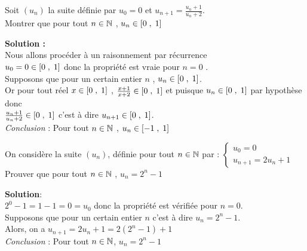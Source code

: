 \begin{exercice}
 Soit $(u_{n})$ la suite définie par $u_{0}=0$ et $ u_{n+1}= \frac{u_{n}+1}{u_{n}+2}$.\\
Montrer que pour tout $ n\in\mathbb{N} $ , $ u_{n}\in\left[0\;,\; 1\right] $ 
\end{exercice}
\textbf{Solution :}\\
 Nous allons procéder à un raisonnement par récurrence \\
$u_{0}=0 \in\left[0\;,\; 1\right] $ donc la propriété  est vraie pour $ n=0 $ .\\
Supposons que pour un certain  entier $ n$ , $ u_{n}\in\left[0\;,\; 1\right] $.\\
Or pour tout réel $ x\in\left[0\;,\; 1\right] $ , $\frac{x+1}{x+2}\in\left[0\;,\; 1\right] $ et puisque $ u_{n}\in\left[0\;,\; 1\right]$  par hypothèse donc \\
$ \frac{u_{n}+1}{u_{n}+2}\in\left[0\;,\; 1\right]$ c'est à dire $ u_{n+1}\in\left[0\;,\; 1\right]$. \\
\emph{Conclusion} : Pour tout $ n\in\mathbb{N} $ , $ u_{n}\in\left[-1\;,\; 1\right] $
\begin{exercice}
 On considère la suite $(u_{n})$, définie pour tout  $ n\in\mathbb{N} $ par : $ 
\left\{\begin{array}{l}
u_{0}=0 \\
u_{n+1}=2u_{n}+1
\end{array}\right.$ \\
Prouver que pour tout $ n\in\mathbb{N} $  , $ u_{n}=2^{n}-1 $
\end{exercice}
\textbf{Solution}:\\
 $2^{0}-1 = 1-1=0= u_{0}$ donc la propriété est vérifiée pour $ n=0 $.\\
Supposons que pour un certain  entier $ n$ c'est à dire $ u_{n}=2^{n}-1 $.\\
Alors, on a $ u_{n+1}=2u_{n}+1= 2(2^{n}-1)+1 $ \\

\emph{Conclusion} : Pour tout $ n\in\mathbb{N} $, $ u_{n}=2^{n}-1 $
